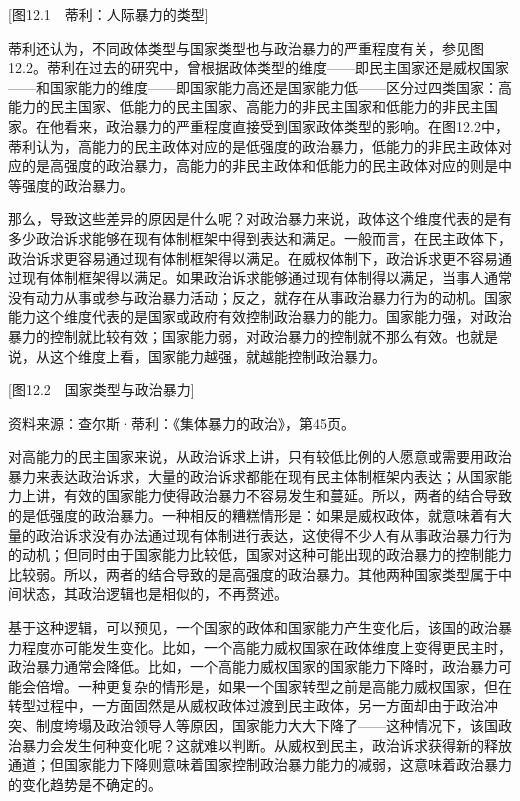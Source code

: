 [图12.1　蒂利：人际暴力的类型]

蒂利还认为，不同政体类型与国家类型也与政治暴力的严重程度有关，参见图12.2。蒂利在过去的研究中，曾根据政体类型的维度——即民主国家还是威权国家——和国家能力的维度——即国家能力高还是国家能力低——区分过四类国家：高能力的民主国家、低能力的民主国家、高能力的非民主国家和低能力的非民主国家。在他看来，政治暴力的严重程度直接受到国家政体类型的影响。在图12.2中，蒂利认为，高能力的民主政体对应的是低强度的政治暴力，低能力的非民主政体对应的是高强度的政治暴力，高能力的非民主政体和低能力的民主政体对应的则是中等强度的政治暴力。

那么，导致这些差异的原因是什么呢？对政治暴力来说，政体这个维度代表的是有多少政治诉求能够在现有体制框架中得到表达和满足。一般而言，在民主政体下，政治诉求更容易通过现有体制框架得以满足。在威权体制下，政治诉求更不容易通过现有体制框架得以满足。如果政治诉求能够通过现有体制得以满足，当事人通常没有动力从事或参与政治暴力活动；反之，就存在从事政治暴力行为的动机。国家能力这个维度代表的是国家或政府有效控制政治暴力的能力。国家能力强，对政治暴力的控制就比较有效；国家能力弱，对政治暴力的控制就不那么有效。也就是说，从这个维度上看，国家能力越强，就越能控制政治暴力。

[图12.2　国家类型与政治暴力]

资料来源：查尔斯·蒂利：《集体暴力的政治》，第45页。

对高能力的民主国家来说，从政治诉求上讲，只有较低比例的人愿意或需要用政治暴力来表达政治诉求，大量的政治诉求都能在现有民主体制框架内表达；从国家能力上讲，有效的国家能力使得政治暴力不容易发生和蔓延。所以，两者的结合导致的是低强度的政治暴力。一种相反的糟糕情形是：如果是威权政体，就意味着有大量的政治诉求没有办法通过现有体制进行表达，这使得不少人有从事政治暴力行为的动机；但同时由于国家能力比较低，国家对这种可能出现的政治暴力的控制能力比较弱。所以，两者的结合导致的是高强度的政治暴力。其他两种国家类型属于中间状态，其政治逻辑也是相似的，不再赘述。

基于这种逻辑，可以预见，一个国家的政体和国家能力产生变化后，该国的政治暴力程度亦可能发生变化。比如，一个高能力威权国家在政体维度上变得更民主时，政治暴力通常会降低。比如，一个高能力威权国家的国家能力下降时，政治暴力可能会倍增。一种更复杂的情形是，如果一个国家转型之前是高能力威权国家，但在转型过程中，一方面固然是从威权政体过渡到民主政体，另一方面却由于政治冲突、制度垮塌及政治领导人等原因，国家能力大大下降了——这种情况下，该国政治暴力会发生何种变化呢？这就难以判断。从威权到民主，政治诉求获得新的释放通道；但国家能力下降则意味着国家控制政治暴力能力的减弱，这意味着政治暴力的变化趋势是不确定的。

